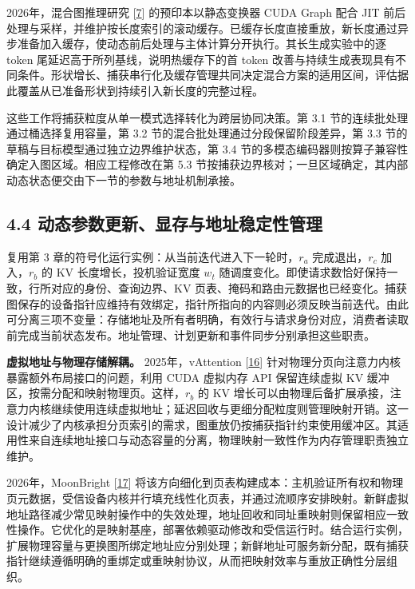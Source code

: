 \documentclass[UTF8,10.5pt,fontset=windows]{ctexart}
\begin{document}
2026年，混合图推理研究
{[}\protect\hyperlink{ref-yadav2026hybridpreprint}{7}{]}
的预印本以静态变换器 CUDA Graph 配合 JIT
前后处理与采样，并维护按长度索引的滚动缓存。已缓存长度直接重放，新长度通过异步准备加入缓存，使动态前后处理与主体计算分开执行。其长生成实验中的逐
token 尾延迟高于所列基线，说明热缓存下的首 token
改善与持续生成表现具有不同条件。形状增长、捕获串行化及缓存管理共同决定混合方案的适用区间，评估据此覆盖从已准备形状到持续引入新长度的完整过程。

这些工作将捕获粒度从单一模式选择转化为跨层协同决策。第 3.1
节的连续批处理通过桶选择复用容量，第 3.2
节的混合批处理通过分段保留阶段差异，第 3.3
节的草稿与目标模型通过独立边界维护状态，第 3.4
节的多模态编码器则按算子兼容性确定入图区域。相应工程修改在第 5.3
节按捕获边界核对；一旦区域确定，其内部动态状态便交由下一节的参数与地址机制承接。

\hypertarget{section-4-4}{%
\subsection{4.4 动态参数更新、显存与地址稳定性管理}\label{section-4-4}}

复用第 3 章的符号化运行实例：从当前迭代进入下一轮时，\(r_a\)
完成退出，\(r_c\) 加入，\(r_b\) 的 KV 长度增长，投机验证宽度 \(w_t\)
随调度变化。即使请求数恰好保持一致，行所对应的身份、查询边界、KV
页表、掩码和路由元数据也已经变化。捕获图保存的设备指针应维持有效绑定，指针所指向的内容则必须反映当前迭代。由此可分离三项不变量：存储地址及所有者明确，有效行与请求身份对应，消费者读取前完成当前状态发布。地址管理、计划更新和事件同步分别承担这些职责。

\textbf{虚拟地址与物理存储解耦。} 2025年，vAttention
{[}\protect\hyperlink{ref-prabhu2025vattention}{16}{]}
针对物理分页向注意力内核暴露额外布局接口的问题，利用 CUDA 虚拟内存 API
保留连续虚拟 KV 缓冲区，按需分配和映射物理页。这样，\(r_b\) 的 KV
增长可以由物理后备扩展承接，注意力内核继续使用连续虚拟地址；延迟回收与更细分配粒度则管理映射开销。这一设计减少了内核承担分页索引的需求，图重放仍按捕获指针约束使用缓冲区。其适用性来自连续地址接口与动态容量的分离，物理映射一致性作为内存管理职责独立维护。

2026年，MoonBright {[}\protect\hyperlink{ref-zhang2026moonbright}{17}{]}
将该方向细化到页表构建成本：主机验证所有权和物理页元数据，受信设备内核并行填充线性化页表，并通过流顺序安排映射。新鲜虚拟地址路径减少常见映射操作中的失效处理，地址回收和同址重映射则保留相应一致性操作。它优化的是映射基座，部署依赖驱动修改和受信运行时。结合运行实例，扩展物理容量与更换图所绑定地址应分别处理；新鲜地址可服务新分配，既有捕获指针继续遵循明确的重绑定或重映射协议，从而把映射效率与重放正确性分层组织。
\end{document}
